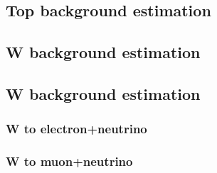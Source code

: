 
\subsection{Top background estimation}


\subsection{W background estimation}


\subsection{W background estimation}


\subsubsection{W to electron+neutrino}


\subsubsection{W to muon+neutrino}



